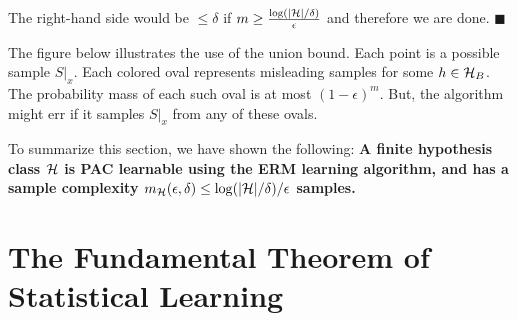 The right-hand side would be $\le \delta$ if $m \ge
\frac{\log(|\mathcal{H}|/\delta)}{\epsilon}$ and therefore we are done. $\blacksquare$

\vspace{5mm}

The figure below illustrates the use of the union bound. Each point is a possible sample $S|_x$. Each colored oval
  represents misleading samples for some $h \in \mathcal{H}_B$. The probability
  mass of each such oval is at most $(1-\epsilon)^{m}$. But, the algorithm
  might err if it samples $S|_x$ from any of these ovals.

\begin{center}
\end{center}

\vspace{5mm}

To summarize this section, we have shown the following:
{\bf A finite hypothesis class $\mathcal{H}$ is PAC learnable using the ERM learning algorithm, and has a sample complexity  $m_{\mathcal{H}}(\epsilon,\delta)\leq \log(|\mathcal{H}|/\delta)/\epsilon$ samples.}




\section{The Fundamental Theorem of Statistical Learning}

